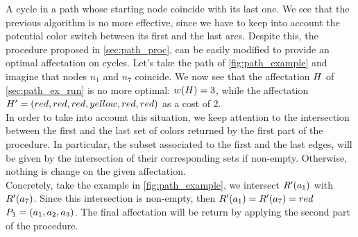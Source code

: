 A cycle in a path whose starting node coincide with its last one.
We see that the previous algorithm is no more effective, since we have to keep into account the potential color switch between its first and the last arcs.
Despite this, the procedure proposed in \cref{sec:path_proc}, can be easily modified to provide an optimal affectation on cycles.
Let's take the path of \cref{fig:path_example} and imagine that nodes $n_1$ and $n_7$ coincide.
We now see that the affectation $H$ of \cref{sec:path_ex_run} is no more optimal: $w(H) = 3$, while the affectation $H' = (red, red, red, yellow, red, red)$ as a cost of $2$.
\\
In order to take into account this situation, we keep attention to the intersection between the first and the last set of colors returned by the first part of the procedure. In particular, the subset associated to the first and the last edges, will be given by the intersection of their corresponding sets if non-empty. Otherwise, nothing is change on the given affectation.
\\
Concretely, take the example in \cref{fig:path_example}, we intersect $R'(a_1)$ with $R'(a_7)$. Since this intersection is non-empty, then $R'(a_1) = R'(a_7) = {red}$ $P_1 = (a_1, a_2, a_3)$. The final affectation will be return by applying the second part of the procedure.

